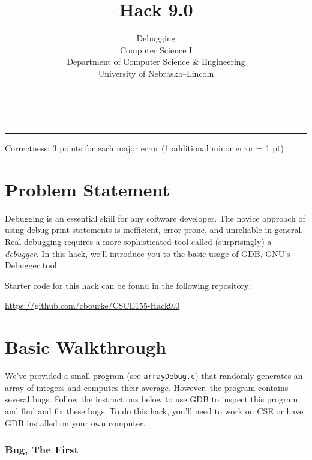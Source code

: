 \documentclass[12pt]{scrartcl}
\title{Hack 9.0}\let\Title\@title
\subtitle{Debugging \\
Computer Science I\\
{\small
\vskip1cm
Department of Computer Science \& Engineering \\
University of Nebraska--Lincoln}
\vskip-1cm}
\date{~}
\begin{document}
\maketitle

\hrule



Correctness: 3 points for each major error (1 additional minor error = 1 pt)


\section*{Problem Statement}

Debugging is an essential skill for any software developer.  The novice
approach of using debug print statements is inefficient, error-prone, and
unreliable in general.  Real debugging requires a more sophisticated tool
called (surprisingly) a \emph{debugger}.  In this hack, we'll introduce you
to the basic usage of GDB, GNU's Debugger tool.

Starter code for this hack can be found in the following repository:

\url{https://github.com/cbourke/CSCE155-Hack9.0}

\section*{Basic Walkthrough}

We've provided a small program (see \texttt{arrayDebug.c}) 
that randomly generates an array of integers
and computes their average.  However, the program contains several bugs.
Follow the instructions below to use GDB to inspect this program and find
and fix these bugs.  To do this hack, you'll need to work on CSE or have 
GDB installed on your own computer.

\subsubsection*{Bug, The First}
\end{document}
